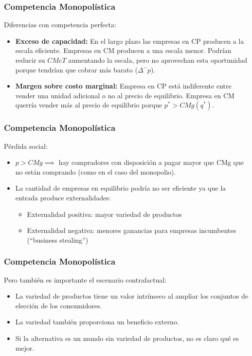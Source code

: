 \documentclass[dvipsnames,table,leqno]{beamer}
\newcommand{\peq}[1]{{\scriptscriptstyle{#1}}}
\newcommand{\rp}[1]{\left(#1\right)}
\begin{document}
		\begin{frame}
			\frametitle{Competencia Monopolística}
			Diferencias con competencia perfecta:
			\begin{itemize}
				\item \textbf{Exceso de capacidad:} En el largo plazo las empresas en CP producen a la escala eficiente. Empresas en CM producen a una escala menor. Podrían reducir su $CMeT$ aumentando la escala, pero no aprovechan esta oportunidad porque tendrían que cobrar más barato ($\Delta^\peq{-}p$).
				\item \textbf{Margen sobre costo marginal:} Empresa en CP está indiferente entre vender una unidad adicional o no al precio de equilibrio. Empresa en CM querría vender más al precio de equilibrio porque $p^\peq{*}>CMg\rp{q^\peq{*}}$.
			\end{itemize}
		\end{frame}
	
		\begin{frame}
			\frametitle{Competencia Monopolística}
			Pérdida social:
			\begin{itemize}
				\item $p>CMg\implies$ hay compradores con disposición a pagar mayor que CMg que no están comprando (como en el caso del monopolio).
				\item La cantidad de empresas en equilibrio podría no ser eficiente ya que la entrada produce externalidades:
					\begin{itemize}
						\item Externalidad positiva: mayor variedad de productos
						\item Externalidad negativa: menores ganancias para empresas incumbentes (``business stealing'')
					\end{itemize}
			\end{itemize}
		\end{frame}		
	
		\begin{frame}
			\frametitle{Competencia Monopolística}
			Pero también es importante el escenario contrafactual:
			\begin{itemize}
				\item La variedad de productos tiene un valor intrínseco al ampliar los conjuntos de elección de los consumidores. 
				\item La variedad también proporciona un beneficio externo.
				\item Si la alternativa es un mundo sin variedad de productos, no es claro qué es mejor.
			\end{itemize}
		\end{frame}		
\end{document}
